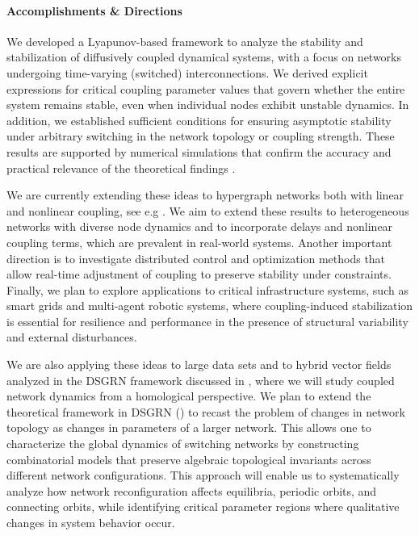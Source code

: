 \documentclass[letterpaper,11pt]{article}
\newcommand{\dg}[1]{{\textcolor{blue}{#1}}}
\begin{document}
\paragraph{Accomplishments \& Directions}

We developed a Lyapunov-based framework to analyze the stability and stabilization of diffusively coupled dynamical systems, with a focus on networks undergoing time-varying (switched) interconnections. 
We derived explicit expressions for critical coupling parameter values that govern whether the entire system remains stable, even when individual nodes exhibit unstable dynamics. 
In addition, we established sufficient conditions for ensuring asymptotic stability under arbitrary switching in the network topology or coupling strength. 
These results are supported by numerical simulations that confirm the accuracy and practical relevance of the theoretical findings \cite{mouyebe2025coupling}.  

We are currently extending these ideas to hypergraph networks both with linear and nonlinear coupling, see e.g \cite{pickard2024kronecker}. 
We aim to extend these results to heterogeneous networks with diverse node dynamics and to incorporate delays and nonlinear coupling terms, which are prevalent in real-world systems. 
Another important direction is to investigate distributed control and optimization methods that allow real-time adjustment of coupling to preserve stability under constraints. 
Finally, we plan to explore applications to critical infrastructure systems, such as smart grids and multi-agent robotic systems, where coupling-induced stabilization is essential for resilience and performance in the presence of structural variability and external disturbances.

We are also applying these ideas to large data sets and to hybrid vector fields analyzed in the DSGRN framework discussed in ,
where we will study coupled network dynamics from a homological perspective.
We plan to extend the theoretical framework in DSGRN (\cite{gameiro2024globaldynamicsordinarydifferential}) to recast the problem of changes in network topology as changes in parameters of a larger network.
This allows one to characterize the global dynamics of switching networks by constructing combinatorial models that preserve algebraic topological invariants across different network configurations.
This approach will enable us to systematically analyze how network reconfiguration affects equilibria, periodic orbits, and connecting orbits, while identifying critical parameter regions where qualitative changes in system behavior occur.
%
\end{document}
